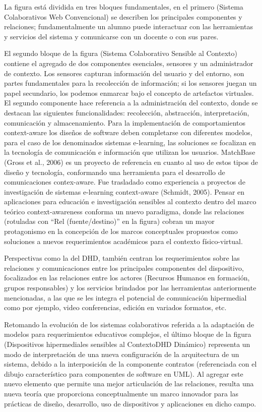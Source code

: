 La figura está dividida en tres bloques fundamentales, en el primero (Sistema
Colaborativos Web Convencional) se describen los principales componentes y
relaciones; fundamentalmente un alumno puede interactuar con las herramientas y
servicios del sistema y comunicarse con un docente o con sus pares.


El segundo bloque de la figura (Sistema Colaborativo Sensible al
Contexto) contiene el
agregado de dos componentes esenciales, sensores y un administrador de contexto.
Los
sensores capturan información del usuario y del entorno, son partes
fundamentales para
la recolección de información; si los sensores juegan un papel secundario, los
podemos
enmarcar bajo el concepto de artefactos virtuales. El segundo componente hace
referencia a la administración del contexto, donde se destacan las siguientes
funcionalidades: recolección, abstracción, interpretación, comunicación y
almacenamiento. Para la implementación de comportamientos context-aware los
diseños de software deben completarse con diferentes modelos, para el caso de
los
denominados sistemas e-learning, las soluciones se focalizan en la tecnología de
comunicación e información que utilizan los usuarios. MatchBase (Gross et al.,
2006)
es un proyecto de referencia en cuanto al uso de estos tipos de diseño y
tecnología,
conformando una herramienta para el desarrollo de comunicaciones contex-aware.
Fue
trasladado como experiencia a proyectos de investigación de sistemas e-learning
context-aware (Schmidt, 2005). Pensar en aplicaciones para educación e
investigación sensibles al contexto dentro del marco teórico context-awareness
conforma un nuevo paradigma, donde las relaciones (rotuladas con “Rel
(fuente/destino)” en la figura) cobran un mayor protagonismo en la concepción de
los marcos conceptuales propuestos como soluciones a nuevos requerimientos
académicos para el contexto físico-virtual.


Perspectivas como la del DHD, también centran los requerimientos sobre
las relaciones y comunicaciones entre los principales componentes del
dispositivo,
focalizados en las relaciones entre los actores (Recursos Humanos en formación,
grupos
responsables) y los servicios brindados por las herramientas anteriormente
mencionadas, a las que se les integra el potencial de comunicación hipermedial
como
por ejemplo, video conferencias, edición en variados formatos, etc.

Retomando la evolución de los sistemas colaborativos referida a la adaptación de
modelos
para requerimientos educativos complejos, el último bloque de la figura
(Dispositivos
hipermediales sensibles al ContextoDHD Dinámico) representa un modo de
interpretación de una
nueva configuración de la arquitectura de un sistema, debido a la interposición
de la
componente contratos (referenciada con el dibujo característico para componentes
de
software en UML). Al agregar este nuevo elemento que permite una mejor
articulación
de las relaciones, resulta una nueva teoría que proporciona conceptualmente un
marco
innovador para las prácticas de diseño, desarrollo, uso de dispositivos y
aplicaciones en dicho campo.


